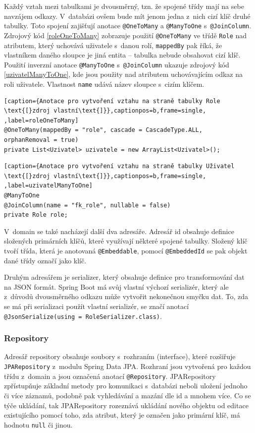 Každý vztah mezi tabulkami je dvousměrný, tzn. že spojené třídy mají na sebe navzájem odkazy. V~databázi ovšem bude mít jenom jedna z~nich cizí klíč druhé tabulky. Toto spojení zajišťují anotace \texttt{@OneToMany} a \texttt{@ManyToOne} s~\texttt{@JoinColumn}. Zdrojový kód \ref{roleOneToMany} zobrazuje použití \texttt{@OneToMany} ve třídě \texttt{Role} nad atributem, který uchovává uživatele s~danou rolí, \texttt{mappedBy} pak říká, že vlastníkem daného sloupce je jiná entita – tabulka nebude obsahovat cizí klíč.
Použití inverzní anotace \texttt{@ManyToOne} s~\texttt{@JoinColumn} ukazuje zdrojový kód \ref{uzivatelManyToOne}, kde jsou použity nad atributem uchovávajícím odkaz na roli uživatele. Vlastnost \texttt{name} udává název sloupce s~cizím klíčem.

\begin{lstlisting}[caption={Anotace pro vytvoření vztahu na straně tabulky Role \text{[}zdroj vlastní\text{]}},captionpos=b,frame=single, ,label=roleOneToMany]
@OneToMany(mappedBy = "role", cascade = CascadeType.ALL, 
orphanRemoval = true)
private List<Uzivatel> uzivatele = new ArrayList<Uzivatel>();
\end{lstlisting}

\begin{lstlisting}[caption={Anotace pro vytvoření vztahu na straně tabulky Uživatel \text{[}zdroj vlastní\text{]}},captionpos=b,frame=single, ,label=uzivatelManyToOne]
@ManyToOne
@JoinColumn(name = "fk_role", nullable = false)
private Role role;
\end{lstlisting}

V~domain se také nacházejí další dva adresáře. Adresář id obsahuje definice složených primárních klíčů, které využívají některé spojené tabulky. Složený klíč tvoří třída, která je anotovaná \texttt{@Embeddable}, pomocí \texttt{@EmbeddedId} se pak objekt dané třídy označí jako klíč.

Druhým adresářem je serializer, který obsahuje definice pro transformování dat na JSON formát. Spring Boot má svůj vlastní výchozí serializér, který ale z~důvodů dvousměrného odkazu může vytvořit nekonečnou smyčku dat. To, zda se má při serializaci použít vlastní serializér, se značí anotací \texttt{@JsonSerialize(using = RoleSerializer.class)}.

\subsubsection *{Repository}

Adresář repository obsahuje soubory s~rozhraním (interface), které rozšiřuje \texttt{JPARepository} z~modulu Spring Data JPA. Rozhraní jsou vytvořená pro každou třídu z~domain a jsou označená anotací \texttt{@Repository}. JPARepository zpřístupňuje základní metody pro komunikaci s~databázi neboli uložení jednoho či více záznamů, podobně pak vyhledávání a mazání dle id a mnohem více. Co se týče ukládání, tak JPARepository rozeznává ukládání nového objektu od editace existujícího pomocí toho, zda atribut, který je označen jako primární klíč, má hodnotu \texttt{null} či jinou.

